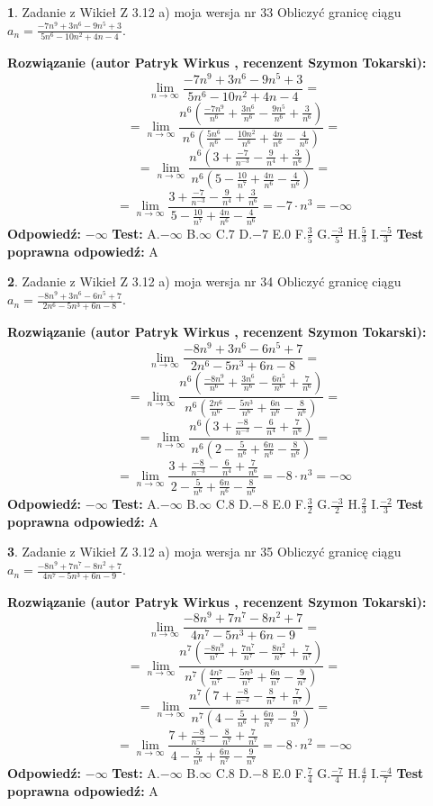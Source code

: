 \documentclass[12pt, a4paper]{article}
\theoremstyle{definition} %
\newtheorem{zad}{}
\newcommand{\zadStart}[1]{\begin{zad}#1\newline}
\newcommand{\zadStop}{\end{zad}}
\newcommand{\rozwStart}[2]{\noindent \textbf{Rozwiązanie (autor #1 , recenzent #2): }\newline}
\newcommand{\rozwStop}{\newline}
\newcommand{\odpStart}{\noindent \textbf{Odpowiedź:}\newline}
\newcommand{\odpStop}{\newline}
\newcommand{\testStart}{\noindent \textbf{Test:}\newline}
\newcommand{\testStop}{\newline}
\newcommand{\kluczStart}{\noindent \textbf{Test poprawna odpowiedź:}\newline}
\newcommand{\kluczStop}{\newline}
\begin{document}
\zadStart{Zadanie z Wikieł Z 3.12 a) moja wersja nr 33}
Obliczyć granicę ciągu $a_{n}=\frac{-7n^{9}+3n^{6}-9n^{5}+3}{5n^{6}-10n^{2}+4n-4}$.
\zadStop
\rozwStart{Patryk Wirkus}{Szymon Tokarski}
$$\lim\limits_{n\to\infty}\frac{-7n^{9}+3n^{6}-9n^{5}+3}{5n^{6}-10n^{2}+4n-4}=$$
$$=\lim\limits_{n\to\infty}\frac{n^{6}\left(\frac{-7n^{9}}{n^{6}}+\frac{3n^{6}}{n^{6}}-\frac{9n^{5}}{n^{6}}+\frac{3}{n^{6}}\right)}{n^{6}\left(\frac{5n^{6}}{n^{6}}-\frac{10n^{2}}{n^{6}}+\frac{4n}{n^{6}}-\frac{4}{n^{6}}\right)}=$$
$$=\lim\limits_{n\to\infty}\frac{n^{6}\left(3+\frac{-7}{n^{-3}}-\frac{9}{n^{4}}+\frac{3}{n^{6}}\right)}
{n^{6}\left(5-\frac{10}{n^{7}}+\frac{4n}{n^{6}}-\frac{4}{n^{6}}\right)}=$$
$$=\lim\limits_{n\to\infty}\frac{3+\frac{-7}{n^{-3}}-\frac{9}{n^{4}}+\frac{3}{n^{6}}}{5-\frac{10}{n^{7}}+\frac{4n}{n^{6}}-\frac{4}{n^{6}}}=-7\cdot n^{3} = -\infty$$
\rozwStop
\odpStart
$-\infty$
\odpStop
\testStart
A.$-\infty$
B.$\infty$
C.$7$
D.$-7$
E.$0$
F.$\frac{3}{5}$
G.$\frac{-3}{5}$
H.$\frac{5}{3}$
I.$\frac{-5}{3}$
\testStop
\kluczStart
A
\kluczStop



\zadStart{Zadanie z Wikieł Z 3.12 a) moja wersja nr 34}
Obliczyć granicę ciągu $a_{n}=\frac{-8n^{9}+3n^{6}-6n^{5}+7}{2n^{6}-5n^{3}+6n-8}$.
\zadStop
\rozwStart{Patryk Wirkus}{Szymon Tokarski}
$$\lim\limits_{n\to\infty}\frac{-8n^{9}+3n^{6}-6n^{5}+7}{2n^{6}-5n^{3}+6n-8}=$$
$$=\lim\limits_{n\to\infty}\frac{n^{6}\left(\frac{-8n^{9}}{n^{6}}+\frac{3n^{6}}{n^{6}}-\frac{6n^{5}}{n^{6}}+\frac{7}{n^{6}}\right)}{n^{6}\left(\frac{2n^{6}}{n^{6}}-\frac{5n^{3}}{n^{6}}+\frac{6n}{n^{6}}-\frac{8}{n^{6}}\right)}=$$
$$=\lim\limits_{n\to\infty}\frac{n^{6}\left(3+\frac{-8}{n^{-3}}-\frac{6}{n^{4}}+\frac{7}{n^{6}}\right)}
{n^{6}\left(2-\frac{5}{n^{6}}+\frac{6n}{n^{6}}-\frac{8}{n^{6}}\right)}=$$
$$=\lim\limits_{n\to\infty}\frac{3+\frac{-8}{n^{-3}}-\frac{6}{n^{4}}+\frac{7}{n^{6}}}{2-\frac{5}{n^{6}}+\frac{6n}{n^{6}}-\frac{8}{n^{6}}}=-8\cdot n^{3} = -\infty$$
\rozwStop
\odpStart
$-\infty$
\odpStop
\testStart
A.$-\infty$
B.$\infty$
C.$8$
D.$-8$
E.$0$
F.$\frac{3}{2}$
G.$\frac{-3}{2}$
H.$\frac{2}{3}$
I.$\frac{-2}{3}$
\testStop
\kluczStart
A
\kluczStop



\zadStart{Zadanie z Wikieł Z 3.12 a) moja wersja nr 35}
Obliczyć granicę ciągu $a_{n}=\frac{-8n^{9}+7n^{7}-8n^{2}+7}{4n^{7}-5n^{3}+6n-9}$.
\zadStop
\rozwStart{Patryk Wirkus}{Szymon Tokarski}
$$\lim\limits_{n\to\infty}\frac{-8n^{9}+7n^{7}-8n^{2}+7}{4n^{7}-5n^{3}+6n-9}=$$
$$=\lim\limits_{n\to\infty}\frac{n^{7}\left(\frac{-8n^{9}}{n^{7}}+\frac{7n^{7}}{n^{7}}-\frac{8n^{2}}{n^{7}}+\frac{7}{n^{7}}\right)}{n^{7}\left(\frac{4n^{7}}{n^{7}}-\frac{5n^{3}}{n^{7}}+\frac{6n}{n^{7}}-\frac{9}{n^{7}}\right)}=$$
$$=\lim\limits_{n\to\infty}\frac{n^{7}\left(7+\frac{-8}{n^{-2}}-\frac{8}{n^{7}}+\frac{7}{n^{7}}\right)}
{n^{7}\left(4-\frac{5}{n^{6}}+\frac{6n}{n^{7}}-\frac{9}{n^{7}}\right)}=$$
$$=\lim\limits_{n\to\infty}\frac{7+\frac{-8}{n^{-2}}-\frac{8}{n^{7}}+\frac{7}{n^{7}}}{4-\frac{5}{n^{6}}+\frac{6n}{n^{7}}-\frac{9}{n^{7}}}=-8\cdot n^{2} = -\infty$$
\rozwStop
\odpStart
$-\infty$
\odpStop
\testStart
A.$-\infty$
B.$\infty$
C.$8$
D.$-8$
E.$0$
F.$\frac{7}{4}$
G.$\frac{-7}{4}$
H.$\frac{4}{7}$
I.$\frac{-4}{7}$
\testStop
\kluczStart
A
\kluczStop
\end{document}
